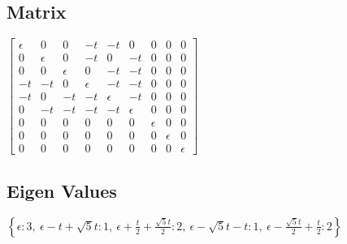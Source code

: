 \documentclass[11pt]{article}
\begin{document}
    \subsection{Matrix}
    $\left[\begin{matrix}\epsilon & 0 & 0 & - t & - t & 0 & 0 & 0 & 0\\0 & \epsilon & 0 & - t & 0 & - t & 0 & 0 & 0\\0 & 0 & \epsilon & 0 & - t & - t & 0 & 0 & 0\\- t & - t & 0 & \epsilon & - t & - t & 0 & 0 & 0\\- t & 0 & - t & - t & \epsilon & - t & 0 & 0 & 0\\0 & - t & - t & - t & - t & \epsilon & 0 & 0 & 0\\0 & 0 & 0 & 0 & 0 & 0 & \epsilon & 0 & 0\\0 & 0 & 0 & 0 & 0 & 0 & 0 & \epsilon & 0\\0 & 0 & 0 & 0 & 0 & 0 & 0 & 0 & \epsilon\end{matrix}\right]$

    \subsection{Eigen Values}
    $\left\{ \epsilon : 3, \  \epsilon - t + \sqrt{5} t : 1, \  \epsilon + \frac{t}{2} + \frac{\sqrt{5} t}{2} : 2, \  \epsilon - \sqrt{5} t - t : 1, \  \epsilon - \frac{\sqrt{5} t}{2} + \frac{t}{2} : 2\right\}$
\end{document}
